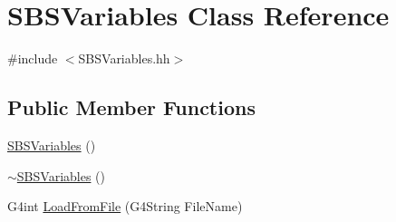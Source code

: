 \hypertarget{class_s_b_s_variables}{\section{S\-B\-S\-Variables Class Reference}
\label{class_s_b_s_variables}
}


{\ttfamily \#include $<$S\-B\-S\-Variables.\-hh$>$}

\subsection*{Public Member Functions}
\begin{DoxyCompactItemize}
\item 
\hyperlink{class_s_b_s_variables_afd6b16b0acdea92ad9cc5b311c57ba87}{S\-B\-S\-Variables} ()
\item 
\hyperlink{class_s_b_s_variables_af4fc969fc880e0a390b3eaafae0678a2}{$\sim$\-S\-B\-S\-Variables} ()
\item 
G4int \hyperlink{class_s_b_s_variables_a2d26940b705eab7e5a0eb11d4ff28dd5}{Load\-From\-File} (G4\-String File\-Name)
\end{DoxyCompactItemize}

